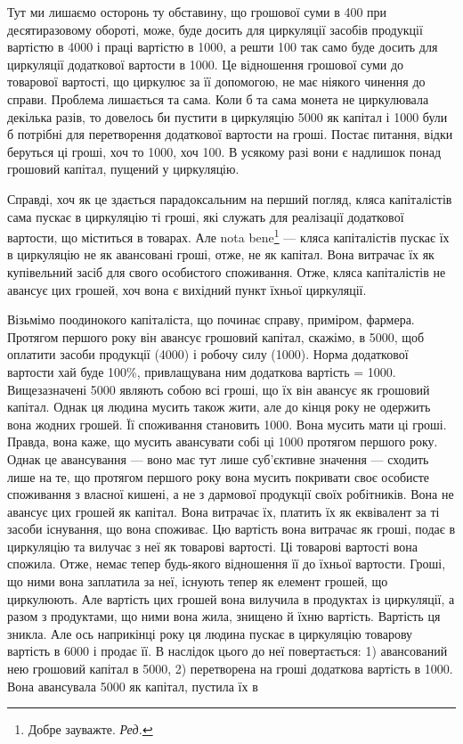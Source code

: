 Тут ми лишаємо осторонь ту обставину, що грошової суми в 400 при десятиразовому обороті, може, буде досить для циркуляції
засобів продукції вартістю в 4000 і праці вартістю в 1000, а решти 100 так само буде досить для циркуляції додаткової
вартости в 1000. Це відношення грошової суми до товарової
вартості, що циркулює за її допомогою, не має ніякого чинення до
справи. Проблема лишається та сама. Коли б та сама монета не циркулювала
декілька разів, то довелось би пустити в циркуляцію 5000
як капітал і 1000 були б потрібні для перетворення додаткової
вартости на гроші. Постає питання, відки беруться ці гроші, хоч то
1000, хоч 100. В усякому разі вони є надлишок понад
грошовий капітал, пущений у циркуляцію.

Справді, хоч як це здається парадоксальним на перший погляд, кляса
капіталістів сама пускає в циркуляцію ті гроші, які служать для реалізації
додаткової вартости, що міститься в товарах. Але nota bene\footnote*{
Добре зауважте. \emph{Ред.}
} — кляса
капіталістів пускає їх в циркуляцію не як авансовані гроші, отже, не як
капітал. Вона витрачає їх як купівельний засіб для свого особистого
споживання. Отже, кляса капіталістів не авансує цих грошей, хоч вона
є вихідний пункт їхньої циркуляції.

Візьмімо поодинокого капіталіста, що починає справу, приміром,
фармера. Протягом першого року він авансує грошовий капітал, скажімо,
в 5000, щоб оплатити засоби продукції (4000) і робочу
силу (1000). Норма додаткової вартости хай буде 100\%, привлащувана
ним додаткова вартість = 1000. Вищезазначені 5000 являють собою всі гроші, що їх він авансує як грошовий капітал.
Однак ця людина мусить також жити, але до кінця року не одержить
вона жодних грошей. Її споживання становить 1000. Вона мусить
мати ці гроші. Правда, вона каже, що мусить авансувати собі ці 1000
протягом першого року. Однак це авансування — воно має тут лише
суб’єктивне значення — сходить лише на те, що протягом першого року
вона мусить покривати своє особисте споживання з власної кишені, а не
з дармової продукції своїх робітників. Вона не авансує цих грошей як
капітал. Вона витрачає їх, платить їх як еквівалент за ті засоби існування,
що вона споживає. Цю вартість вона витрачає як гроші, подає в
циркуляцію та вилучає з неї як товарові вартості. Ці товарові вартості
вона спожила. Отже, немає тепер будь-якого відношення її до їхньої
вартости. Гроші, що ними вона заплатила за неї, існують тепер як елемент
грошей, що циркулюють. Але вартість цих грошей вона вилучила
в продуктах із циркуляції, а разом з продуктами, що ними вона жила,
знищено й їхню вартість. Вартість ця зникла. Але ось наприкінці року
ця людина пускає в циркуляцію товарову вартість в 6000 і продає її.
В наслідок цього до неї повертається: 1) авансований нею грошовий
капітал в 5000, 2) перетворена на гроші додаткова вартість в
1000. Вона авансувала 5000 як капітал, пустила їх в
\parbreak{}  %
